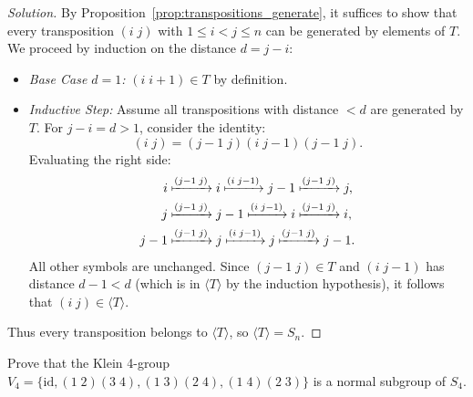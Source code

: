 \begin{proof}[Solution]
By Proposition~\ref{prop:transpositions_generate}, it suffices to show that every transposition $(i \; j)$ with $1 \le i < j \le n$ can be generated by elements of $T$.
We proceed by induction on the distance $d = j - i$:
\begin{itemize}[leftmargin=1.5em, itemsep=4pt]
    \item \emph{Base Case $d = 1$:} $(i \; i+1) \in T$ by definition.
    \item \emph{Inductive Step:} Assume all transpositions with distance $< d$ are generated by $T$.
    For $j - i = d > 1$, consider the identity:
    \begin{equation*}
    (i \; j) = (j-1 \; j)(i \; j-1)(j-1 \; j).
    \end{equation*}
    Evaluating the right side:
    \begin{align*}
    i &\xmapsto{(j-1 \; j)} i \xmapsto{(i \; j-1)} j-1 \xmapsto{(j-1 \; j)} j, \\
    j &\xmapsto{(j-1 \; j)} j-1 \xmapsto{(i \; j-1)} i \xmapsto{(j-1 \; j)} i, \\
    j-1 &\xmapsto{(j-1 \; j)} j \xmapsto{(i \; j-1)} j \xmapsto{(j-1 \; j)} j-1.
    \end{align*}
    All other symbols are unchanged.
    Since $(j-1 \; j) \in T$ and $(i \; j-1)$ has distance $d - 1 < d$ (which is in $\langle T \rangle$ by the induction hypothesis), it follows that $(i \; j) \in \langle T \rangle$.
\end{itemize}
Thus every transposition belongs to $\langle T \rangle$, so $\langle T \rangle = S_n$.
\end{proof}

\begin{problem}
Prove that the Klein 4-group $V_4 = \{ \text{id}, (1 \; 2)(3 \; 4), (1 \; 3)(2 \; 4), (1 \; 4)(2 \; 3) \}$ is a normal subgroup of $S_4$.
\end{problem}

